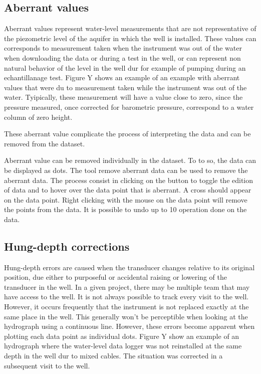 \documentclass[WHATMANUAL.tex]{subfiles}
\begin{document}
\subsection{Aberrant values}

Aberrant values represent water-level measurements that are not representative of the piezometric level of the aquifer in which the well is installed. These values can corresponds to measurement taken when the instrument was out of the water when downloading the data or during a test in the well, or can represent non natural behavior of the level in the well dur for example of pumping during an echantillanage test. Figure Y shows an example of an example with aberrant values that were du to measurement taken while the instrument was out of the water. Tyipically, these measurement will have a value close to zero, since the pressure measured, once corrected for barometric pressure, correspond to a water column of zero height.

These aberrant value complicate the process of interpreting the data and can be removed from the dataset. 

Aberrant value can be removed individually in the dataset. To to so, the data can be displayed as dots. The tool remove aberrant data can be used to remove the aberrant data. The process consist in clicking on the button to toggle the edition of data and to hover over the data point that is aberrant. A cross should appear on the data point. Right clicking with the mouse on the data point will remove the points from the data. It is possible to undo up to 10 operation done on the data.

\subsection{Hung-depth corrections}

Hung-depth errors are caused when the transducer changes relative to its original position, due either to purposeful or accidental raising or lowering of the transducer in the well. In a given project, there may be multiple team that may have access to the well. It is not always possible to track every visit to the well. However, it occurs frequently that the instrument is not replaced exactly at the same place in the well. This generally won't be perceptible when looking at the hydrograph using a continuous line. However, these errors become apparent when plotting each data point as individual dots. Figure Y show an example of an hydrograph where the water-level data logger was not reinstalled at the same depth in the well dur to mixed cables. The situation was corrected in a subsequent visit to the well.
\end{document}
